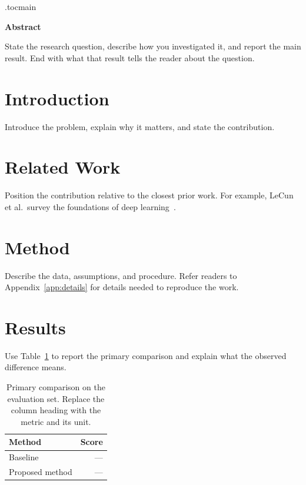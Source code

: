 \documentclass[11pt,letterpaper]{article}
\title{\papertitle}
\author{\paperauthors\\[3pt]
    {\small Institution}\\
    {\small\texttt{author@example.org}}}
\date{}
\renewenvironment{abstract}{%
    \par\small\noindent\textbf{Abstract}\par\nobreak
    \vspace{3pt}\noindent\ignorespaces
}{\par\vspace{7pt}}
\begin{document}
\etocdepthtag.toc{main}
\maketitle

\begin{abstract}
State the research question, describe how you investigated it, and report the
main result. End with what that result tells the reader about the question.
\end{abstract}

\section{Introduction}
Introduce the problem, explain why it matters, and state the contribution.

\section{Related Work}
Position the contribution relative to the closest prior work. For example,
LeCun et al.\ survey the foundations of deep learning~\citep{lecunDeepLearning2015}.

\section{Method}
Describe the data, assumptions, and procedure. Refer readers to
Appendix~\ref{app:details} for details needed to reproduce the work.

\section{Results}
Use Table~\ref{tab:results} to report the primary comparison and explain what
the observed difference means.

\begin{table}[htbp]
    \centering
    \small
    \caption{Primary comparison on the evaluation set. Replace the column
        heading with the metric and its unit.}
    \label{tab:results}
    \begin{tabular}{@{}lr@{}}
        \toprule
        Method & Score \\
        \midrule
        Baseline        & --- \\
        Proposed method & --- \\
        \bottomrule
    \end{tabular}
\end{table}
\end{document}
